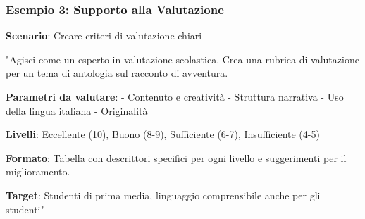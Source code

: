 \documentclass[aspectratio=169]{beamer}
\begin{document}
\begin{frame}
\frametitle{Esempio 3: Supporto alla Valutazione}
\textbf{Scenario}: Creare criteri di valutazione chiari

\begin{examplebox}
"Agisci come un esperto in valutazione scolastica. Crea una rubrica di valutazione per un tema di antologia sul racconto di avventura.

\textbf{Parametri da valutare}:
- Contenuto e creatività
- Struttura narrativa
- Uso della lingua italiana
- Originalità

\textbf{Livelli}: Eccellente (10), Buono (8-9), Sufficiente (6-7), Insufficiente (4-5)

\textbf{Formato}: Tabella con descrittori specifici per ogni livello e suggerimenti per il miglioramento.

\textbf{Target}: Studenti di prima media, linguaggio comprensibile anche per gli studenti"
\end{examplebox}
\end{frame}
%
\end{document}
